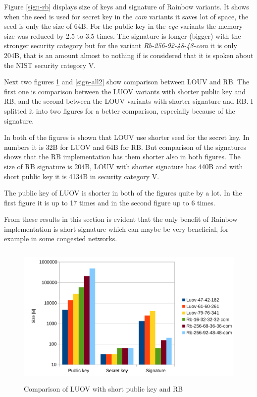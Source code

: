 \documentclass[thesis=M,english]{FITthesis}[2019/12/23]
\begin{document}
\noindent
Figure \ref{sign-rb} displays size of keys and signature of Rainbow variants. It shows when the seed is used for secret key in the \textit{com} variants it saves lot of space, the seed is only the size of 64B. For the public key in the \textit{cyc} variants the memory size was reduced by 2.5 to 3.5 times. The signature is longer (bigger) with the stronger security category but for the variant \textit{Rb-256-92-48-48-com} it is only 204B, that is an amount almost to nothing if is considered that it is spoken about the NIST security category V.

\bigskip
\noindent
Next two figures \ref{sign-all1} and \ref{sign-all2} show comparison between LOUV and RB. The first one is comparison between the LUOV variants with shorter public key and RB, and the second between the LOUV variants with shorter signature and RB. I splitted it into two figures for a better comparison, especially because of the signature.

\bigskip
\noindent
In both of the figures is shown that LOUV use shorter seed for the secret key. In numbers it is 32B for LUOV and 64B for RB. But comparison of the signatures shows that the RB implementation has them shorter also in both figures. The size of RB signature is 204B, LOUV with shorter signature has 440B and with short public key it is 4134B in security category V.

\bigskip
\noindent
The public key of LUOV is shorter in both of the figures quite by a lot. In the first figure it is up to 17 times and in the second figure up to 6 times.

\bigskip
\noindent
From these results in this section is evident that the only benefit of Rainbow implementation is short signature which can maybe be very beneficial, for example in some congested networks.

\begin{figure}[H]
\centering
\includegraphics[width=13cm,height=7cm]{images/mem-sign-all1.pdf}
\caption{Comparison of LUOV with short public key and RB}
\label{sign-all1}
\end{figure}
\end{document}
